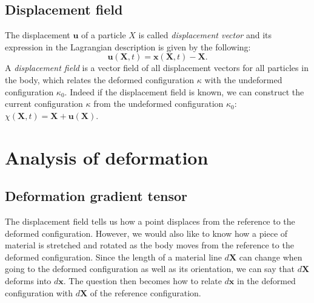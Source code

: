 	\subsection{Displacement field}
The displacement $ \mathbf{u} $ of a particle $X$ is called \emph{displacement vector} and its expression in the Lagrangian description is given by the following:
\begin{equation}
\mathbf{u}(\textbf{X}, t) = \mathbf{x}(\mathbf{X}, t) - \mathbf{X}.
\end{equation}
A \emph{displacement field} is a vector field of all displacement vectors for all particles in the body, which relates the deformed configuration $\kappa$ with the undeformed configuration $\kappa_{0}$. Indeed if the displacement field is known, we can construct the current configuration $\kappa$ from the undeformed configuration $\kappa_{0}$: $\chi(\mathbf{X}, t) = \mathbf{X} + \mathbf{u}(\mathbf{X})$. 	
	
\section{Analysis of deformation}

	\subsection{Deformation gradient tensor}
The displacement field tells us how a point displaces from the reference to the deformed configuration. However, we would also like to know how a piece of material is stretched and rotated as the body moves from the reference to the deformed configuration. Since the length of a material line $d\mathbf{X}$ can change when going to the deformed configuration as well as its orientation, we can say that $d\mathbf{X}$ deforms into $d\mathbf{x}$. The question then becomes how to relate $d\mathbf{x}$ in the deformed configuration with $d\mathbf{X}$ of the reference configuration. 

